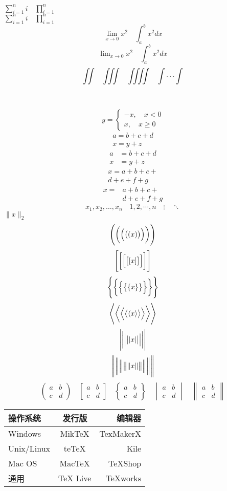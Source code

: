 \documentclass[UTF8]{ctexart}
\begin{document}
$ \sum_{i=1}^n i\quad \prod_{i=1}^n $\\
$ \sum\limits _{i=1}^n i\quad \prod\limits _{i=1}^n $\\
\[ \lim_{x\to0}x^2 \quad \int_a^b x^2 dx \]
\[ \lim\nolimits _{x\to0}x^2\quad \int\nolimits_a^b x^2 dx \]
\[ \iint\quad \iiint\quad \iiiint\quad \idotsint \]
\\
\\
\[ y= \begin{cases}
-x,\quad x<0 \\
x,\quad x\geq0
\end{cases} \]
\begin{gather}
a = b+c+d \\
x = y+z
\end{gather}
\begin{align}
a &= b+c+d \\
x &= y+z
\end{align}
\begin{multline}
x = a+b+c+{} \\
d+e+f+g
\end{multline}
\[\begin{aligned}
x ={}& a+b+c+{} \\
&d+e+f+g
\end{aligned}\]
\[ x_1,x_2,\dots ,x_n\quad 1,2,\cdots ,n\quad\vdots\quad \ddots \]
$\lVert x\rVert_2$
\[ \Biggl(\biggl(\Bigl(\bigl((x)\bigr)\Bigr)\biggr)\Biggr) \]
\[ \Biggl[\biggl[\Bigl[\bigl[[x]\bigr]\Bigr]\biggr]\Biggr] \]
\[ \Biggl \{\biggl \{\Bigl \{\bigl \{\{x\}\bigr \}\Bigr \}\biggr \}\Biggr\} \]
\[ \Biggl\langle\biggl\langle\Bigl\langle\bigl\langle\langle x
\rangle\bigr\rangle\Bigr\rangle\biggr\rangle\Biggr\rangle \]
\[ \Biggl\lvert\biggl\lvert\Bigl\lvert\bigl\lvert\lvert x
\rvert\bigr\rvert\Bigr\rvert\biggr\rvert\Biggr\rvert \]
\[ \Biggl\lVert\biggl\lVert\Bigl\lVert\bigl\lVert\lVert x
\rVert\bigr\rVert\Bigr\rVert\biggr\rVert\Biggr\rVert \]
\[ \begin{pmatrix} a&b\\c&d \end{pmatrix} \quad
\begin{bmatrix} a&b\\c&d \end{bmatrix} \quad
\begin{Bmatrix} a&b\\c&d \end{Bmatrix} \quad
\begin{vmatrix} a&b\\c&d \end{vmatrix} \quad
\begin{Vmatrix} a&b\\c&d \end{Vmatrix} \]


\begin{tabular}{|l|c|r|}
 \hline
操作系统& 发行版& 编辑器\\
 \hline
Windows & MikTeX & TexMakerX \\
 \hline
Unix/Linux & teTeX & Kile \\
 \hline
Mac OS & MacTeX & TeXShop \\
 \hline
通用& TeX Live & TeXworks \\
 \hline
\end{tabular}
\end{document}
